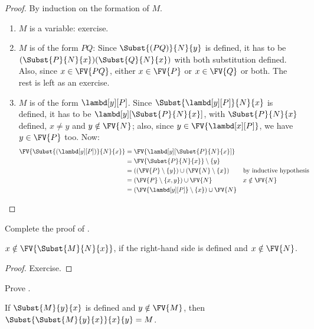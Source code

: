 \documentclass[../../../include/open-logic-section]{subfiles}
\begin{document}
\begin{proof}
  By induction on the formation of $M$.
  \begin{enumerate}
  \item $M$ is a variable: exercise.
  \item $M$ is of the form $PQ$: Since
    $\Subst{(PQ)}{N}{y}$ is defined, it has to be
    $(\Subst{P}{N}{x})(\Subst{Q}{N}{x})$ with both substitution
    defined. Also, since $x \in \FV{PQ}$, either $x \in \FV{P}$ or
    $x \in \FV{Q}$ or both. The rest is left as an exercise.
  \item $M$ is of the form $\lambd[y][P]$. Since
    $\Subst{\lambd[y][P]}{N}{x}$ is defined, it has to be
    $\lambd[y][\Subst{P}{N}{x}]$, with $\Subst{P}{N}{x}$
    defined, $x \neq y$ and $y \notin \FV{N}$; also, since $y \in
    \FV{\lambd[x][P]}$, we have $y \in \FV{P}$ too. Now:
    \begin{align*}
      \FV{\Subst{(\lambd[y][P])}{N}{x}}
      & = \FV{\lambd[y][\Subst{P}{N}{x}]} \\
      & = \FV{\Subst{P}{N}{x}} \setminus \{y\} \\
      & = ((\FV{P} \setminus \{y\}) \cup (\FV{N} \setminus \{x\})
       && \text{by inductive hypothesis} \\
      & = (\FV{P} \setminus \{x, y\}) \cup \FV{N}
       && x \notin \FV{N} \\
      & = (\FV{\lambd[y][P]} \setminus \{x\}) \cup \FV{N}
    \end{align*}
  \end{enumerate}
\end{proof}

\begin{prob}
  Complete the proof of .
\end{prob}

\begin{thm}
  $x \notin \FV{\Subst{M}{N}{x}}$, if the right-hand side is
  defined and $x \notin \FV{N}$.
\end{thm}

\begin{proof}
  Exercise.
\end{proof}

\begin{prob}
  Prove .
\end{prob}


\begin{thm}
  If $\Subst{M}{y}{x}$ is defined and $y \notin \FV{M}$, then
  $\Subst{\Subst{M}{y}{x}}{x}{y} = M$.
\end{thm}
\end{document}
